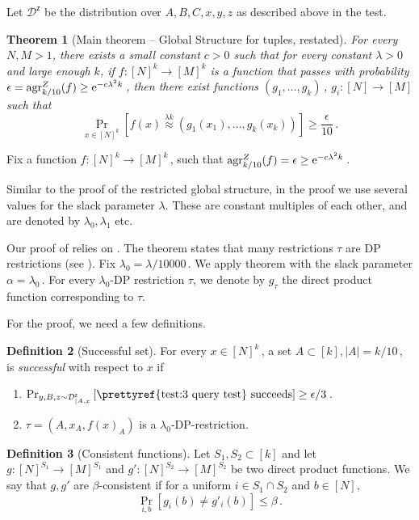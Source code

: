 \documentclass[11pt]{article}
\numberwithin{equation}{section}
\newtheorem{theorem}{Theorem}[section]
\theoremstyle{definition}
\newtheorem{definition}[theorem]{Definition}
\theoremstyle{plain}
\newcommand{\eee}{\mathrm e}
\newcommand{\Prob}[2][]{\Pr_{{#1}}\left[#2\right]} %
\newcommand{\Brac}[1]{\left[#1\right]} %
\newcommand{\abs}[1]{\lvert#1\rvert} %
\newcommand\f{f} %
\newcommand{\g}{g} %
\newcommand\pf{g} %
\newcommand{\test}[2]{
	\ifx &#2&
	\textrm{agr}^{#1}
	\else	
	\textrm{agr}^{#1}_{#2}
	\fi}
\newcommand\neql[1]{\stackrel{{#1}}{ \approx}} %
\newcommand{\D}{\mathcal{D}^{\mathsf{z}}} %
\begin{document}
Let $\D$ be the distribution over $A,B,C,x,y,z$ as described above in the test.
\begin{theorem}[Main theorem -- Global Structure for tuples, restated]
	For every $N,M>1$, there exists a small constant $c > 0$ such that for every constant $\lambda>0$ and large enough $k$, if $\f:[N]^k \rightarrow[M]^k$ is a function that passes  with probability  $\epsilon=\test{Z}{k/10}(\f) \geq \eee^{-c \lambda^2 k}$\,, then there exist functions $(\pf_1,\ldots, \pf_k)$\,, $\pf_i:[N]\rightarrow[M]$ such that
	\[\Prob[x\in\Brac{N}^k]{\f(x) \neql{\lambda k}( \pf_1(x_1),\ldots ,\pf_k(x_k))} \geq \frac{\epsilon}{10}\,.\]%
\end{theorem}

Fix a function $\f:[N]^k\rightarrow[M]^k$\,, such that $\test{Z}{k/10}(\f) =\epsilon\geq \eee^{-c \lambda^2 k}$\,.


Similar to the proof of the restricted global structure, in the proof we use several values for the slack parameter $\lambda$. These are constant multiples of each other, and are denoted by $\lambda_0,\lambda_1$ etc.


Our proof of  relies on . The theorem states that many restrictions $\tau$ are DP restrictions (see ). 
Fix $\lambda_0 = 
%
\lambda/10000$\,. %
We apply theorem  with the slack parameter $\alpha = \lambda_0$\,.
For every $\lambda_0$-DP restriction $\tau$, we denote by $\g_\tau$ the direct product function corresponding to $\tau$.


For the proof, we need a few definitions.

\begin{definition}[Successful set]
	For every $x\in[N]^k$\,, a set $A\subset[k],\abs{A} = k/10$\,, is \emph{successful} with respect to $x$ if
	\begin{enumerate}
		\item $\Prob[y,B,z\sim \D_{|A,x}]{\text{\prettyref{test:3 query test} succeeds}}\geq 
		\epsilon/3$\,. %
		\item $\tau = (A,x_A,\f(x)_A)$ is a $\lambda_0$-DP-restriction.
	\end{enumerate}
\end{definition}

\begin{definition}[Consistent functions]\label{def:consistent func}
    Let $S_1,S_2\subset [k]$ and let $\g:[N]^{S_1}\rightarrow[M]^{S_1}$ and $\g':[N]^{S_2}\rightarrow[M]^{S_2}$ be two direct product functions. We say that $\g,\g'$ are $\beta$-consistent if for a uniform $i\in S_1\cap S_2$ and $b\in [N]$,
	\[ \Prob[i,b]{\g_i(b)\neq \g'_i(b)} \leq \beta \,.\] %
\end{definition}
\end{document}
